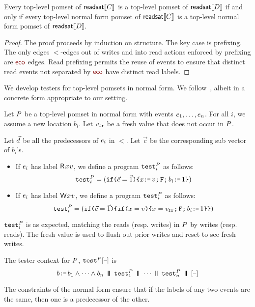\begin{lemma}\label{unrhd}
Every top-level pomset of $\mathsf{readsat}\llbracket C\rrbracket$ is a top-level pomset of $\mathsf{readsat}\llbracket D\rrbracket$ if and only if 
every top-level normal form pomset of $\mathsf{readsat}\llbracket C\rrbracket$ is a top-level normal form pomset of $\mathsf{readsat}\llbracket D\rrbracket$.
\begin{proof}
The proof proceeds by induction on structure.  The key case is prefixing.  The only edges $\lt$-edges out of writes  and into read actions enforced by prefixing are $\reco$ edges.  Read prefixing permits the reuse of events to ensure that distinct read events not separated by $\reco$ have distinct read labels.  
\end{proof}
\end{lemma}

We develop testers for top-level pomsets in normal form.  We  follow~\citet{Plotkin:1997:TSP:266557.266600}, albeit in a concrete form appropriate to our setting.   

Let $P$ be a top-level pomset in normal form with events $e_1, \ldots,
e_n$.  For all $i$, we assume a new location $b_i$.    Let $v_{{\tt fr}}$ be a fresh value that does not occur in $P$.  

Let $\vec{d}$ be all  the predecessors of $e_i$ in $\lt$. Let $\vec{c}$ be the corresponding sub vector of $b_i$'s. 
\begin{itemize}
\item 
If $e_i$ has label $\DR{\aLoc}{\aVal}$, we define a program ${\tt test}^{P}_{i}$ as follows:  
\[
  {\tt test}^{P}_{i} = (
  \texttt{if}\allowbreak\texttt{(}\vec{c}=\vec{1}\texttt{)} \allowbreak\texttt{\{} x \texttt{:}\mkern-1mu\texttt{=}\, v \texttt{;}\,\allowbreak  \texttt{F} \texttt{;}\,\allowbreak b_i \texttt{:}\mkern-1mu\texttt{=}\, 1 \texttt{\}})
\]
\item 
If $e_i$ has label $\DW{\aLoc}{\aVal}$, we define a program ${\tt test}^{P}_{i}$ as follows:
\[
  \testP{\aPS}{i} = (
  \IF{\vec{c}=\vec{1}} \THEN %
  \IF{\aLoc = \aVal} \THEN \aLoc = \freshaval \SEMI \FENCE \SEMI b_i \GETS 1  \FI \FI)
\]
\end{itemize}
${\tt test}^{P}_{i}$ is as expected, matching the reads (resp. writes) in $P$ by writes (resp. reads).  The fresh value is used to flush out prior writes and reset to see fresh writes.    

\begin{definition}\label{testAPS} 
The tester context for $P$, $\testP{\aPS}{}\hole{}$ is 
\[
b \GETS b_{1} \land  \cdots \land b_{n}
\PAR  \testP{\aPS}{1} 
\PAR   \cdots 
\PAR  \testP{\aPS}{n} 
\PAR \hole{}
\]
\end{definition}
The constraints of the normal form ensure that if the labels of any two events are the same, then one is a predecessor of the other. 

